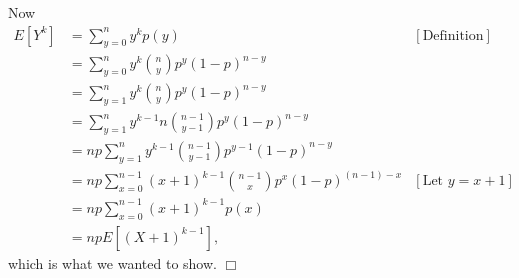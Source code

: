 \documentclass[9pt]{article}
\newcommand{\qed}{\hfill \ensuremath{\Box}}
\begin{document}
\begin{enumerate}
      Now
      \begin{align*}
         E[Y^k] &= \sum_{y=0}^ny^kp(y) &[\text{Definition}] \\
                &= \sum_{y=0}^ny^k\binom{n}{y}p^y(1 - p)^{n - y} \\
                &= \sum_{y=1}^ny^k\binom{n}{y}p^y(1 - p)^{n - y} \\
                &= \sum_{y=1}^ny^{k-1}n\binom{n - 1}{y - 1}p^y(1 - p)^{n - y} \\
                &= np\sum_{y=1}^ny^{k-1}\binom{n - 1}{y - 1}
                   p^{y-1}(1 - p)^{n - y} \\
                &= np\sum_{x=0}^{n-1}(x + 1)^{k-1}\binom{n - 1}{x}
                   p^{x}(1 - p)^{(n - 1)-x} &[\text{Let }y = x + 1] \\
                &= np\sum_{x=0}^{n-1}(x + 1)^{k-1}p(x) \\
                &= npE[(X + 1)^{k-1}],
      \end{align*}
      which is what we wanted to show. \qed
\end{enumerate}
\end{document}
